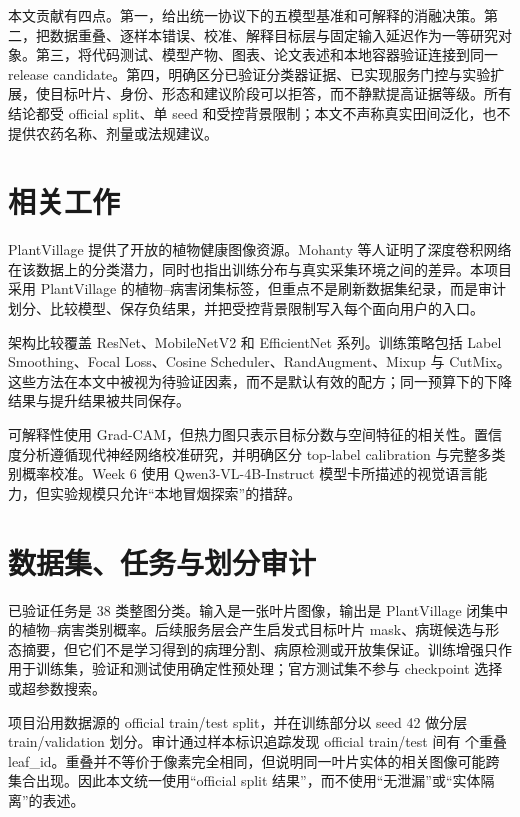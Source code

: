 \documentclass[UTF8,11pt]{ctexart}
\begin{document}
本文贡献有四点。第一，给出统一协议下的五模型基准和可解释的消融决策。第二，把数据重叠、逐样本错误、校准、解释目标层与固定输入延迟作为一等研究对象。第三，将代码测试、模型产物、图表、论文表述和本地容器验证连接到同一 release candidate。第四，明确区分已验证分类器证据、已实现服务门控与实验扩展，使目标叶片、身份、形态和建议阶段可以拒答，而不静默提高证据等级。所有结论都受 official split、单 seed 和受控背景限制；本文不声称真实田间泛化，也不提供农药名称、剂量或法规建议。

\section{相关工作}

PlantVillage 提供了开放的植物健康图像资源\cite{hughes2015plantvillage}。Mohanty 等人证明了深度卷积网络在该数据上的分类潜力，同时也指出训练分布与真实采集环境之间的差异\cite{mohanty2016plantdisease}。本项目采用 PlantVillage 的植物--病害闭集标签，但重点不是刷新数据集纪录，而是审计划分、比较模型、保存负结果，并把受控背景限制写入每个面向用户的入口。

架构比较覆盖 ResNet\cite{he2016resnet}、MobileNetV2\cite{sandler2018mobilenetv2} 和 EfficientNet\cite{tan2019efficientnet} 系列。训练策略包括 Label Smoothing\cite{szegedy2016label}、Focal Loss\cite{lin2017focal}、Cosine Scheduler\cite{loshchilov2017sgdr}、RandAugment\cite{cubuk2020randaugment}、Mixup\cite{zhang2018mixup} 与 CutMix\cite{yun2019cutmix}。这些方法在本文中被视为待验证因素，而不是默认有效的配方；同一预算下的下降结果与提升结果被共同保存。

可解释性使用 Grad-CAM\cite{selvaraju2017gradcam}，但热力图只表示目标分数与空间特征的相关性。置信度分析遵循现代神经网络校准研究\cite{guo2017calibration}，并明确区分 top-label calibration 与完整多类别概率校准。Week 6 使用 Qwen3-VL-4B-Instruct 模型卡所描述的视觉语言能力\cite{qwen3vl2025modelcard}，但实验规模只允许“本地冒烟探索”的措辞。

\section{数据集、任务与划分审计}

已验证任务是 38 类整图分类。输入是一张叶片图像，输出是 PlantVillage 闭集中的植物--病害类别概率。后续服务层会产生启发式目标叶片 mask、病斑候选与形态摘要，但它们不是学习得到的病理分割、病原检测或开放集保证。训练增强只作用于训练集，验证和测试使用确定性预处理；官方测试集不参与 checkpoint 选择或超参数搜索。

项目沿用数据源的 official train/test split，并在训练部分以 seed 42 做分层 train/validation 划分。审计通过样本标识追踪发现 official train/test 间有 \PDAOfficialOverlap 个重叠 leaf\_id。重叠并不等价于像素完全相同，但说明同一叶片实体的相关图像可能跨集合出现。因此本文统一使用“official split 结果”，而不使用“无泄漏”或“实体隔离”的表述。
\end{document}
